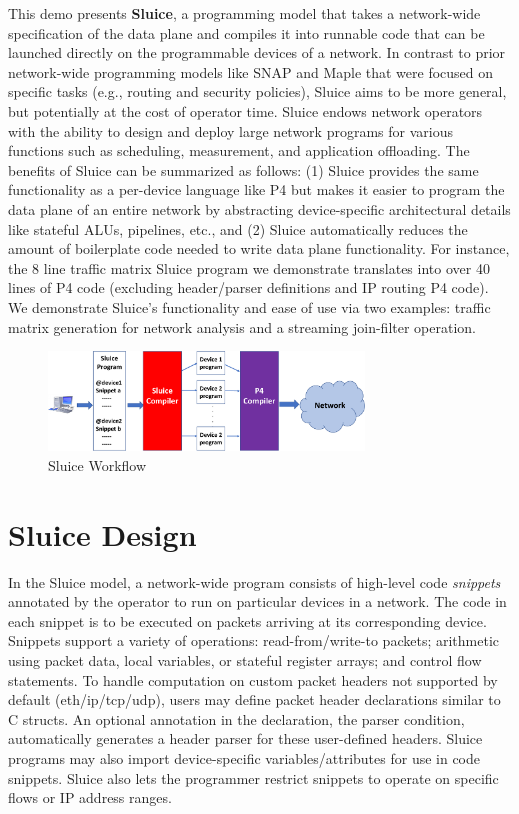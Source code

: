 This demo presents \textbf{Sluice}, a programming model that takes a
network-wide specification of the data plane and compiles it into runnable code
that can be launched directly on the programmable devices of a network. In
contrast to prior network-wide programming models like SNAP and Maple that were
focused on specific tasks (e.g., routing and security policies), Sluice aims to
be more general, but potentially at the cost of operator time.
Sluice endows network operators with the ability to design and deploy large
network programs for various functions such as scheduling, measurement, and
application offloading.  The benefits of Sluice can be summarized as follows: (1) Sluice provides the same functionality as a per-device language like P4 but makes it easier to program the data plane of an entire network by abstracting device-specific architectural details like stateful ALUs, pipelines, etc., and (2) Sluice automatically reduces the amount of boilerplate code needed to write data plane functionality. For instance, the 8 line traffic matrix Sluice program we demonstrate translates into over 40 lines of P4 code (excluding header/parser definitions and IP routing P4 code). We demonstrate Sluice's functionality and ease of use via two examples: traffic matrix generation for network analysis and a streaming join-filter operation.
\begin{figure}[tp]
\centering
\includegraphics[width=84mm,scale=0.7]{figures/sluice_workflow.pdf}
\caption{Sluice Workflow}
\vspace{-8mm}
\end{figure}
\vspace{-4mm}

\section{Sluice Design}
In the Sluice model, a network-wide program consists of high-level code
\textit{snippets} annotated by the operator to run on particular devices in a
network. The code in each snippet is to be executed on packets arriving at its
corresponding device. Snippets support a variety of operations:
read-from/write-to packets; arithmetic using packet data, local variables, or
stateful register arrays; and control flow statements. To handle computation on
custom packet headers not supported by default (eth/ip/tcp/udp), users may
define packet header declarations similar to C structs. An optional annotation
in the declaration, the parser condition, automatically generates a header
parser for these user-defined headers. Sluice programs may also import
device-specific variables/attributes for use in code snippets. Sluice also lets
the programmer restrict snippets to operate on specific flows or IP address
ranges.

